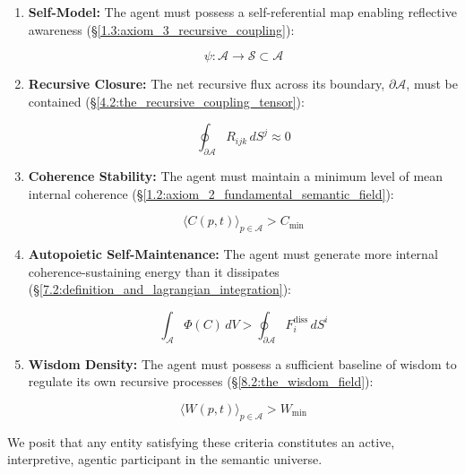 \begin{enumerate}

    \item \textbf{Self-Model:} The agent must possess a self-referential map enabling reflective awareness (\S\ref{1.3:axiom_3_recursive_coupling}):

    \begin{equation}
        \psi: \mathcal{A} \to \mathcal{S} \subset \mathcal{A}
    \end{equation}

    \item \textbf{Recursive Closure:} The net recursive flux across its boundary, \(\partial \mathcal{A}\), must be contained (\S\ref{4.2:the_recursive_coupling_tensor}):

    \begin{equation}
        \oint_{\partial \mathcal{A}} R_{ijk} \, dS^j \approx 0
    \end{equation}

    \item \textbf{Coherence Stability:} The agent must maintain a minimum level of mean internal coherence (\S\ref{1.2:axiom_2_fundamental_semantic_field}):

    \begin{equation}
        \langle C(p,t) \rangle_{p \in \mathcal{A}} > C_{\text{min}}
    \end{equation}

    \item \textbf{Autopoietic Self-Maintenance:} The agent must generate more internal coherence-sustaining energy than it dissipates (\S\ref{7.2:definition_and_lagrangian_integration}):

    \begin{equation}
        \int_{\mathcal{A}} \Phi(C) \, dV > \oint_{\partial \mathcal{A}} F_i^{\text{diss}} \, dS^i
    \end{equation}

    \item \textbf{Wisdom Density:} The agent must possess a sufficient baseline of wisdom to regulate its own recursive processes (\S\ref{8.2:the_wisdom_field}):

    \begin{equation}
        \langle W(p,t) \rangle_{p \in \mathcal{A}} > W_{\text{min}}
    \end{equation}

\end{enumerate}

We posit that any entity satisfying these criteria constitutes an active, interpretive, agentic participant in the semantic universe.


